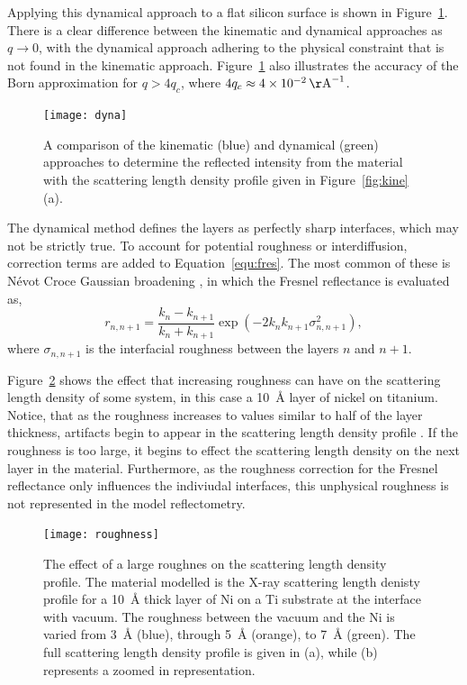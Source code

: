 \documentclass[
 reprint,
 superscriptaddress,
 amsmath,amssymb,
 aps,
]{revtex4-1}
\newcommand{\angstrom}{\rm{\AA}}
\begin{document}
Applying this dynamical approach to a flat silicon surface is shown in Figure~\ref{fig:dyna}.
There is a clear difference between the kinematic and dynamical approaches as $q \to 0$, with the dynamical approach adhering to the physical constraint that is not found in the kinematic approach. 
Figure~\ref{fig:dyna} also illustrates the accuracy of the Born approximation for $q > 4 q_c$, where $4q_c\approx\SI{0.04}{\angstrom^{-1}}$.%
%
\begin{figure}[t]
    \texttt{[image: dyna]}
    \caption{A comparison of the kinematic (blue) and dynamical (green) approaches to determine the reflected intensity from the material with the scattering length density profile given in Figure~\ref{fig:kine}(a).}
    \label{fig:dyna}
\end{figure}
%

The dynamical method defines the layers as perfectly sharp interfaces, which may not be strictly true. 
To account for potential roughness or interdiffusion, correction terms are added to Equation~\ref{equ:fres}. 
The most common of these is N\'{e}vot Croce Gaussian broadening \cite{nevot_caracterisation_1980}, in which the Fresnel reflectance is evaluated as, 
%
\begin{equation}
    r_{n, n+1} = \frac{k_n - k_{n+1}}{k_n + k_{n+1}} \exp{(-2k_nk_{n+1}\sigma^2_{n,n+1})},
\end{equation}
%
where $\sigma_{n, n+1}$ is the interfacial roughness between the layers $n$ and $n+1$.

Figure~\ref{fig:rough} shows the effect that increasing roughness can have on the scattering length density of some system, in this case a \SI{10}{\angstrom} layer of nickel on titanium. 
Notice, that as the roughness increases to values similar to half of the layer thickness, artifacts begin to appear in the scattering length density profile \cite{tolan_xray_1999}. 
If the roughness is too large, it begins to effect the scattering length density on the next layer in the material. 
Furthermore, as the roughness correction for the Fresnel reflectance only influences the indiviudal interfaces, this unphysical roughness is not represented in the model reflectometry. 
%
\begin{figure}[t]
    \texttt{[image: roughness]}
    \caption{The effect of a large roughnes on the scattering length density profile. The material modelled is the X-ray scattering length denisty profile for a \SI{10}{\angstrom} thick layer of Ni on a Ti substrate at the interface with vacuum. The roughness between the vacuum and the Ni is varied from \SI{3}{\angstrom} (blue), through \SI{5}{\angstrom} (orange), to \SI{7}{\angstrom} (green). The full scattering length density profile is given in (a), while (b) represents a zoomed in representation.}
    \label{fig:rough}
\end{figure}
%
\end{document}
